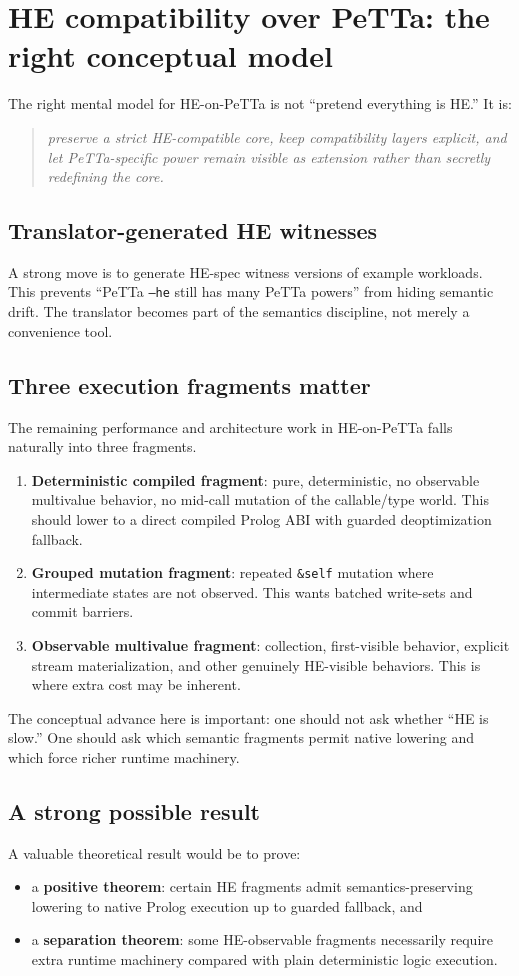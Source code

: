 \documentclass[11pt]{article}
\begin{document}
\section{HE compatibility over PeTTa: the right conceptual model}
The right mental model for HE-on-PeTTa is not ``pretend everything is HE.'' It is:
\begin{quote}
\emph{preserve a strict HE-compatible core, keep compatibility layers explicit, and let PeTTa-specific power remain visible as extension rather than secretly redefining the core.}
\end{quote}

\subsection{Translator-generated HE witnesses}
A strong move is to generate HE-spec witness versions of example workloads. This prevents ``PeTTa \texttt{--he} still has many PeTTa powers'' from hiding semantic drift. The translator becomes part of the semantics discipline, not merely a convenience tool.

\subsection{Three execution fragments matter}
The remaining performance and architecture work in HE-on-PeTTa falls naturally into three fragments.
\begin{enumerate}
  \item \textbf{Deterministic compiled fragment}: pure, deterministic, no observable multivalue behavior, no mid-call mutation of the callable/type world. This should lower to a direct compiled Prolog ABI with guarded deoptimization fallback.
  \item \textbf{Grouped mutation fragment}: repeated \texttt{\&self} mutation where intermediate states are not observed. This wants batched write-sets and commit barriers.
  \item \textbf{Observable multivalue fragment}: collection, first-visible behavior, explicit stream materialization, and other genuinely HE-visible behaviors. This is where extra cost may be inherent.
\end{enumerate}

The conceptual advance here is important: one should not ask whether ``HE is slow.'' One should ask which semantic fragments permit native lowering and which force richer runtime machinery.

\subsection{A strong possible result}
A valuable theoretical result would be to prove:
\begin{itemize}
  \item a \textbf{positive theorem}: certain HE fragments admit semantics-preserving lowering to native Prolog execution up to guarded fallback, and
  \item a \textbf{separation theorem}: some HE-observable fragments necessarily require extra runtime machinery compared with plain deterministic logic execution.
\end{itemize}
\end{document}
